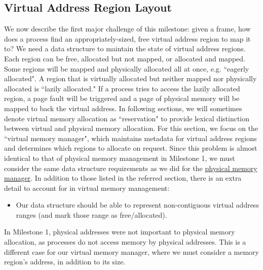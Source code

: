 \subsection{Virtual Address Region Layout}
We now describe the first major challenge of this milestone: given a frame, how does a process find an appropriately-sized, free virtual address region to map it to? We need a data structure to maintain the state of virtual address regions. Each region can be free, allocated but not mapped, or allocated and mapped. Some regions will be mapped and physically allocated all at once, e.g. ``eagerly allocated". A region that is virtually allocated but neither mapped nor physically allocated is ``lazily allocated." If a process tries to access the lazily allocated region, a page fault will be triggered and a page of physical memory will be mapped to back the virtual address. In following sections, we will sometimes denote virtual memory allocation as ``reservation" to provide lexical distinction between virtual and physical memory allocation. For this section, we focus on the ``virtual memory manager", which maintains metadata for virtual address regions and determines which regions to allocate on request. Since this problem is almost identical to that of physical memory management in Milestone 1, we must consider the same data structure requirements as we did for the \hyperref[m1-3]{physical memory manager}. In addition to those listed in the referred section, there is an extra detail to account for in virtual memory management:
\begin{itemize}[itemsep=0pt]
    \item Our data structure should be able to represent non-contiguous virtual address ranges (and mark those range as free/allocated).
\end{itemize}

In Milestone 1, physical addresses were not important to physical memory allocation, as processes do not access memory by physical addresses. This is a different case for our virtual memory manager, where we must consider a memory region's address, in addition to its size.

